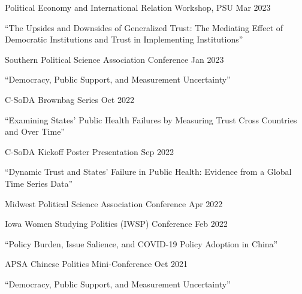 \documentclass[10.5pt,]{article}
\providecommand{\tightlist}{%
	\setlength{\itemsep}{0pt}\setlength{\parskip}{0pt}}
\renewenvironment{itemize}{
	\begin{list}{}{
			\setlength{\leftmargin}{1.5em}
		}
	}{
	\end{list}
}
\begin{document}
\begin{itemize}
  \begin{itemize}
  \tightlist
  \item
    Political Economy and International Relation Workshop, PSU
    \hfill Mar 2023
  \end{itemize}
\item
  ``The Upsides and Downsides of Generalized Trust: The Mediating Effect
  of Democratic Institutions and Trust in Implementing Institutions''

  \begin{itemize}
  \tightlist
  \item
    Southern Political Science Association Conference \hfill Jan 2023
  \end{itemize}
\item
  ``Democracy, Public Support, and Measurement Uncertainty''

  \begin{itemize}
  \tightlist
  \item
    C-SoDA Brownbag Series \hfill Oct 2022
  \end{itemize}
\item
  ``Examining States' Public Health Failures by Measuring Trust Cross
  Countries and Over Time''

  \begin{itemize}
  \tightlist
  \item
    C-SoDA Kickoff Poster Presentation \hfill Sep 2022
  \end{itemize}
\item
  ``Dynamic Trust and States' Failure in Public Health: Evidence from a
  Global Time Series Data''

  \begin{itemize}
  \tightlist
  \item
    Midwest Political Science Association Conference \hfill Apr 2022
  \item
    Iowa Women Studying Politics (IWSP) Conference \hfill Feb 2022
  \end{itemize}
\item
  ``Policy Burden, Issue Salience, and COVID-19 Policy Adoption in
  China''

  \begin{itemize}
  \tightlist
  \item
    APSA Chinese Politics Mini-Conference \hfill Oct 2021
  \end{itemize}
\item
  ``Democracy, Public Support, and Measurement Uncertainty''


\end{itemize}
\end{document}
